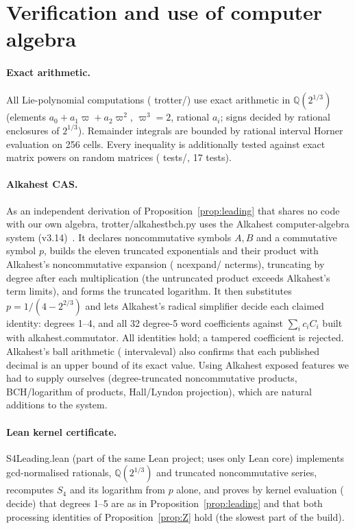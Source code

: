 \documentclass[11pt]{article}
\newcommand{\Qc}{\mathbb{Q}(2^{1/3})}
\newcommand{\codeus}{\textunderscore\allowbreak}
\newcommand{\code}[1]{{\ttfamily\let\_\codeus\hyphenchar\font=-1 #1}}
\theoremstyle{plain}
\theoremstyle{definition}
\theoremstyle{remark}
\begin{document}
\section{Verification and use of computer algebra}\label{sec:verification}

\paragraph{Exact arithmetic.} All Lie-polynomial computations (\code{trotter/}) use exact arithmetic in
$\Qc$ (elements $a_0+a_1\varpi+a_2\varpi^2$, $\varpi^3=2$, rational $a_i$; signs decided by rational
enclosures of $2^{1/3}$). Remainder integrals are bounded by rational interval Horner evaluation on 256
cells. Every inequality is additionally tested against exact matrix powers on random matrices
(\code{tests/}, 17 tests).

\paragraph{Alkahest CAS.} As an independent derivation of Proposition~\ref{prop:leading} that shares no
code with our own algebra, \code{trotter/alkahest\_bch.py} uses the Alkahest computer-algebra system
(v3.14)~\cite{Alkahest}. It declares noncommutative symbols $A,B$ and a commutative symbol $p$, builds the eleven
truncated exponentials and their product with Alkahest's noncommutative expansion
(\code{nc\_expand}/\code{nc\_terms}), truncating by degree after each multiplication (the untruncated
product exceeds Alkahest's term limits), and forms the truncated logarithm. It then substitutes
$p=1/(4-2^{2/3})$ and lets Alkahest's radical simplifier decide each claimed identity: degrees 1--4, and
all 32 degree-5 word coefficients against $\sum_ic_iC_i$ built with \code{alkahest.commutator}. All
identities hold; a tampered coefficient is rejected. Alkahest's ball arithmetic (\code{interval\_eval})
also confirms that each published decimal is an upper bound of its exact value. Using Alkahest exposed
features we had to supply ourselves (degree-truncated noncommutative products, BCH/logarithm of
products, Hall/Lyndon projection), which are natural additions to the system.

\paragraph{Lean kernel certificate.} \code{S4Leading.lean} (part of the same Lean project; uses only Lean core)
implements gcd-normalised rationals, $\Qc$ and truncated noncommutative series, recomputes $S_4$ and its
logarithm from $p$ alone, and proves by kernel evaluation (\code{decide}) that degrees 1--5 are as in
Proposition~\ref{prop:leading} and that both processing identities of Proposition~\ref{prop:Z} hold
(the slowest part of the build).
\end{document}
